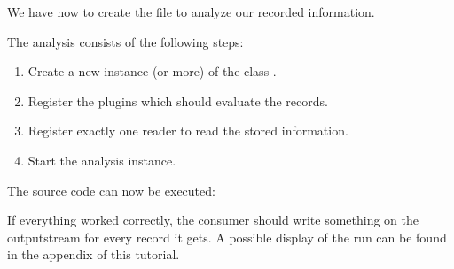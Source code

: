 We have now to create the file  to analyze our recorded information.

\setJavaCodeListing       

\notify The analysis consists of the following steps:
\begin{enumerate}
\item Create a new instance (or more) of the class .
\item Register the plugins which should evaluate the records.
\item Register exactly one reader to read the stored information.
\item Start the analysis instance.
\end{enumerate}
The source code can now be executed:

\setBashListing 		
		

If everything worked correctly, the consumer should write something on the outputstream for every record it gets. A possible display of the run can be found in the appendix of this tutorial. 
